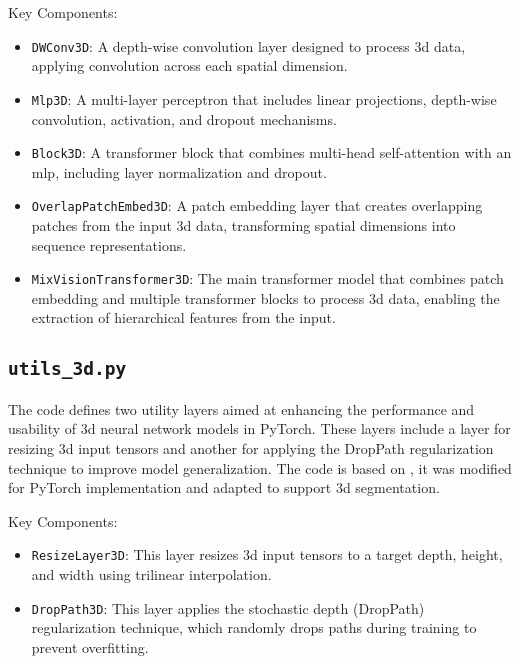 \medskip

\noindent Key Components:
\begin{itemize}
	\item {\tt DWConv3D}: A depth-wise convolution layer designed to process \gls{3d} data, applying convolution across each spatial dimension.
	
	\item {\tt Mlp3D}: A multi-layer perceptron that includes linear projections, depth-wise convolution, activation, and dropout mechanisms.
	
	\item {\tt Block3D}: A transformer block that combines multi-head self-attention with an \gls{mlp}, including layer normalization and dropout.
	
	\item {\tt OverlapPatchEmbed3D}: A patch embedding layer that creates overlapping patches from the input \gls{3d} data, transforming spatial dimensions into sequence representations.
	
	\item {\tt MixVisionTransformer3D}: The main transformer model that combines patch embedding and multiple transformer blocks to process \gls{3d} data, enabling the extraction of hierarchical features from the input.
\end{itemize}




\subsection{{\tt utils\_3d.py}} \label{sec::utils_3d.py}
The code defines two utility layers aimed at enhancing the performance and usability of \gls{3d} neural network models in PyTorch. These layers include a layer for resizing \gls{3d} input tensors and another for applying the DropPath regularization technique to improve model generalization. The code is based on \cite{IMvision12}, it was modified for PyTorch implementation and adapted to support \gls{3d} segmentation.

\medskip

\noindent Key Components:
\begin{itemize}
	\item {\tt ResizeLayer3D}: This layer resizes \gls{3d} input tensors to a target depth, height, and width using trilinear interpolation.
	
	\item {\tt DropPath3D}: This layer applies the stochastic depth (DropPath) regularization technique, which randomly drops paths during training to prevent overfitting.
\end{itemize}

